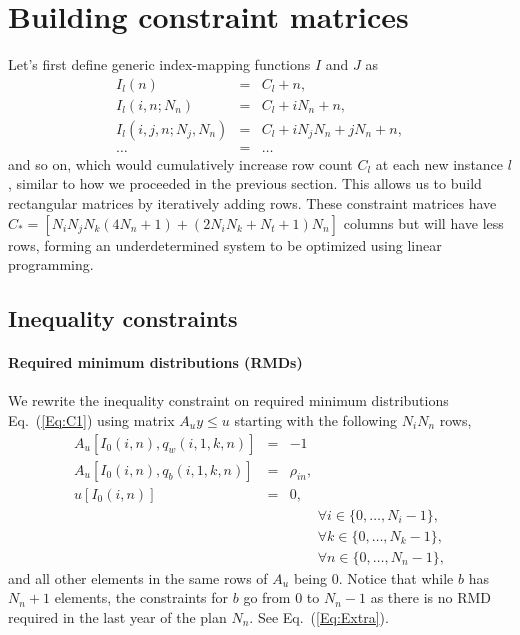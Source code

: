 \documentclass{article}[fleqn,12pt]
\begin{document}
\section{Building constraint matrices}
Let's first define generic index-mapping functions $I$ and $J$ as
\begin{eqnarray}
	\label{Eq:Offsets}
	I_l(n) &=& C_l + n, \nonumber \\
	I_l(i, n; N_n) &=& C_l + iN_n + n, \nonumber \\
	I_l(i, j, n; N_j, N_n) &=& C_l + iN_j N_n + jN_n +n, \\
	\ldots &=& \ldots \nonumber
\end{eqnarray}
and so on, which would cumulatively increase row count $C_l$ at each new instance $l$,
similar to how we proceeded in the previous section.
This allows us to build rectangular matrices by iteratively adding rows.
These constraint matrices have
$C_* = [N_iN_jN_k(4N_n + 1) + (2N_iN_k + N_t + 1) N_n]$
columns but will have less rows,
forming an underdetermined system to be optimized using linear programming.

\subsection{Inequality constraints}

\paragraph*{Required minimum distributions (RMDs)}
We rewrite the inequality constraint on required minimum distributions
Eq.~(\ref{Eq:C1}) using matrix $A_{u}y \le u$ starting with the following $N_iN_n$ rows, 
\begin{eqnarray}
	A_u[I_0(i, n), q_w(i, 1, k, n)] &=& -1 \nonumber \\
	A_u[I_0(i, n), q_b(i, 1, k, n)] &=& \rho_{in}, \nonumber \\
	u[I_0(i, n)] &=& 0, \\
	&&\qquad\forall i \in \{0,\ldots, N_i-1\}, \nonumber\\
	&&\qquad\forall k \in \{0,\ldots, N_k-1\}, \nonumber\\
	&&\qquad\forall n \in \{0,\ldots, N_n -1\},\nonumber
\end{eqnarray}
and all other elements in the same rows of $A_u$ being $0$.
Notice that while $b$ has $N_n+1$ elements, the constraints
for $b$ go from $0$ to $N_n-1$ as there is no RMD required in the last year of the plan $N_n$.
See Eq.~(\ref{Eq:Extra}).
\end{document}
